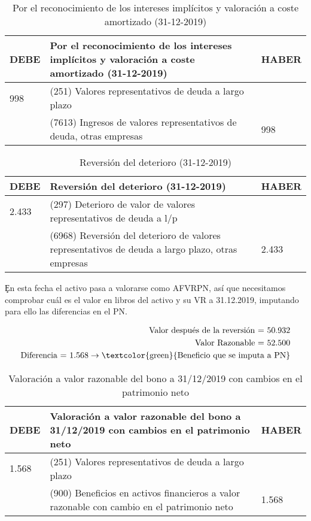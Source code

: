 \begin{table}[H]
    \centering
    \begin{tabular}{|p{2cm}|p{6cm}|p{2cm}|}
    \hline
    \rowcolor{blue!30}
    \textbf{DEBE} & \textbf{Por el reconocimiento de los intereses implícitos y valoración a coste amortizado (31-12-2019)} & \textbf{HABER} \\
    \hline
    998 & (251) Valores representativos de deuda a largo plazo & \\
    \hline
    & (7613) Ingresos de valores representativos de deuda, otras empresas & 998 \\
    \hline
    \end{tabular}
    \caption{Por el reconocimiento de los intereses implícitos y valoración a coste amortizado (31-12-2019)}
    \label{tabla:intereses_implicitos}
\end{table}

\begin{table}[H]
    \centering
    \begin{tabular}{|p{2cm}|p{6cm}|p{2cm}|}
    \hline
    \rowcolor{blue!30}
    \textbf{DEBE} & \textbf{Reversión del deterioro (31-12-2019)} & \textbf{HABER} \\
    \hline
    2.433 & (297) Deterioro de valor de valores representativos de deuda a l/p & \\
    \hline
    & (6968) Reversión del deterioro de valores representativos de deuda a largo plazo, otras empresas & 2.433 \\
    \hline
    \end{tabular}
    \caption{Reversión del deterioro (31-12-2019)}
    \label{tabla:reversion_deterioro}
\end{table}

\c{En esta fecha el activo pasa a valorarse como AFVRPN,} así que necesitamos comprobar cuál es el valor en libros del activo y su VR a 31.12.2019, imputando para ello las diferencias en el PN.

\begin{align*}
    \text{Valor después de la reversión = 50.932} \\
    \text{Valor Razonable = 52.500} \\
    \text{Diferencia = 1.568} \rightarrow \text{\textcolor{green}{Beneficio que se imputa a PN}}
\end{align*}

\begin{table}[H]
    \centering
    \begin{tabular}{|p{3cm}|p{6cm}|p{3cm}|}
    \hline
    \rowcolor{blue!30}
    \textbf{DEBE} & \textbf{Valoración a valor razonable del bono a 31/12/2019 con cambios en el patrimonio neto} & \textbf{HABER} \\
    \hline
    1.568 & (251) Valores representativos de deuda a largo plazo & \\
    \hline
    & (900) Beneficios en activos financieros a valor razonable con cambio en el patrimonio neto & 1.568\\
    \hline
    \end{tabular}
    \caption{Valoración a valor razonable del bono a 31/12/2019 con cambios en el patrimonio neto}
    \label{tabla:valoracion_bono}
\end{table}

